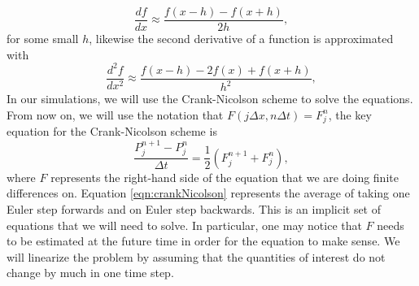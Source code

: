 \begin{equation}
\frac{d f}{d x} \approx \frac{f(x - h) - f(x + h)}{2h},
\end{equation}
for some small $h$, likewise the second derivative of a function is approximated with
\begin{equation}
\frac{d^2 f}{d x^2} \approx \frac{f(x - h) - 2f(x) + f(x + h)}{h^2},
\end{equation}
In our simulations, we will use the Crank-Nicolson scheme \cite{Crank1996,Press2007} to solve the equations. From now on, we will use the notation that $F(j \Delta x, n \Delta t) = F_j^n$, the key equation for the Crank-Nicolson scheme is
\begin{equation}
\frac{P_j^{n+1} - P_j^n}{\Delta t} = \frac{1}{2}(F_j^{n+1} + F_j^n),  \label{eqn:crankNicolson}
\end{equation}
where $F$ represents the right-hand side of the equation that we are doing finite differences on. Equation \ref{eqn:crankNicolson} represents the average of taking one Euler step forwards and on Euler step backwards. This is an implicit set of equations that we will need to solve. In particular, one may notice that $F$ needs to be estimated at the future time in order for the equation to make sense. We will linearize the problem by assuming that the quantities of interest do not change by much in one time step.

